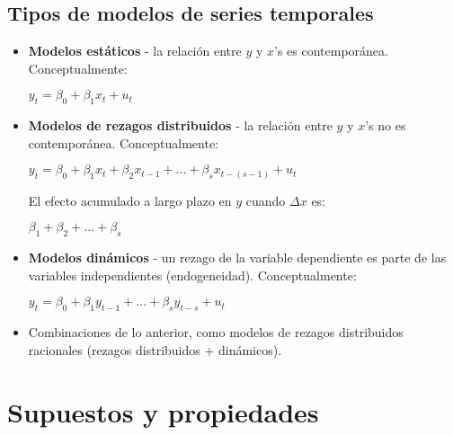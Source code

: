 \documentclass[10pt, a4paper, landscape]{extarticle}
\begin{document}
\begin{multicols}{3}
	\subsection*{Tipos de modelos de series temporales}
		\begin{itemize}[leftmargin=*]
			\item \textbf{Modelos estáticos} - la relación entre $y$ y $x$'s es contemporánea. Conceptualmente:
			\begin{center}
				$y_t = \beta_0 + \beta_1 x_t + u_t$
			\end{center}
			\item \textbf{Modelos de rezagos distribuidos} - la relación entre $y$ y $x$'s no es contemporánea. Conceptualmente:
			\begin{center}
				$y_t = \beta_0 + \beta_1 x_t + \beta_2 x_{t-1} + ... + \beta_{s} x_{t-(s-1)} + u_t$
			\end{center}
			El efecto acumulado a largo plazo en $y$ cuando $\Delta x$ es:
			\begin{center}
			 	$\beta_1 + \beta_2 + ... + \beta_{s}$
			\end{center}
		 	\item \textbf{Modelos dinámicos} - un rezago de la variable dependiente es parte de las variables independientes (endogeneidad). Conceptualmente:
		 	\begin{center}
		 		$y_t = \beta_0 + \beta_1 y_{t-1} + ... + \beta_s y_{t-s} + u_t$
		 	\end{center}
	 		\item Combinaciones de lo anterior, como modelos de rezagos distribuidos racionales (rezagos distribuidos + dinámicos).
		\end{itemize}
\columnbreak
\section*{Supuestos y propiedades}

\end{multicols}
\end{document}
